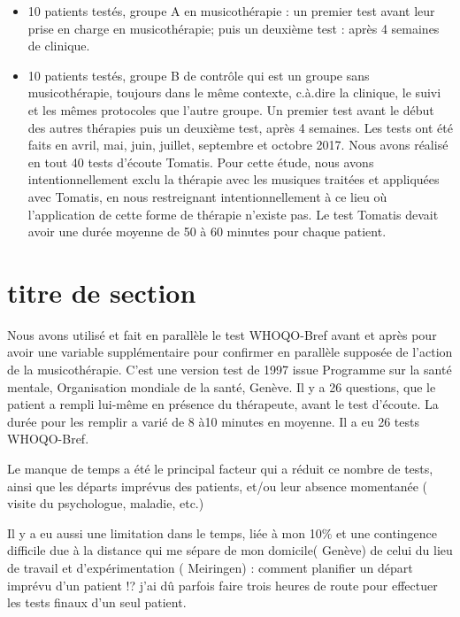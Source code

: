 \begin{itemize}
	\item 10 patients testés, groupe A en musicothérapie : un
          premier test avant leur prise en charge en musicothérapie;
          puis un deuxième test \textdegree{} : après 4 semaines de
          clinique.
	\item 10 patients testés, groupe B de contrôle qui est un groupe sans musicothérapie,
	toujours dans le même contexte, c.à.dire la clinique, le suivi et les mêmes protocoles que l'autre groupe. Un premier test avant
	le début des autres thérapies puis un deuxième test, après 4 semaines. 
	Les tests ont été faits en avril, mai, juin, juillet, septembre et octobre 2017.
	Nous avons réalisé en tout 40 tests d'écoute Tomatis. Pour cette étude, nous avons intentionnellement exclu la thérapie avec les musiques traitées et appliquées avec Tomatis, en nous restreignant  intentionnellement à ce lieu où l'application de cette forme de thérapie n'existe pas.
	Le test Tomatis devait avoir une durée  moyenne de 50 à 60  minutes pour chaque patient.
\end{itemize}

\section{titre de section}

Nous avons utilisé et fait en parallèle le test WHOQO-Bref avant et
après pour avoir une variable supplémentaire pour confirmer en
parallèle supposée de l'action de la musicothérapie.  C'est une
version test de 1997 issue Programme sur la santé mentale,
Organisation mondiale de la santé, Genève. Il y a 26 questions, que le
patient a rempli lui-même en présence du thérapeute, avant le test
d'écoute. La durée pour les remplir a varié de 8 à10 minutes en
moyenne.  Il a eu 26 tests WHOQO-Bref.

Le manque de temps a été le principal facteur qui a réduit ce nombre
de tests, ainsi que les départs imprévus des patients, et/ou leur
absence momentanée ( visite du psychologue, maladie, etc.)


 
Il y a eu aussi une limitation dans le temps, liée à mon 10\% et une
contingence difficile due à la distance qui me sépare de mon domicile(
Genève) de celui du lieu de travail et d'expérimentation ( Meiringen)
: comment planifier un départ imprévu d'un patient !?  j'ai dû parfois
faire trois heures de route pour effectuer les tests finaux d'un seul
patient.
  
